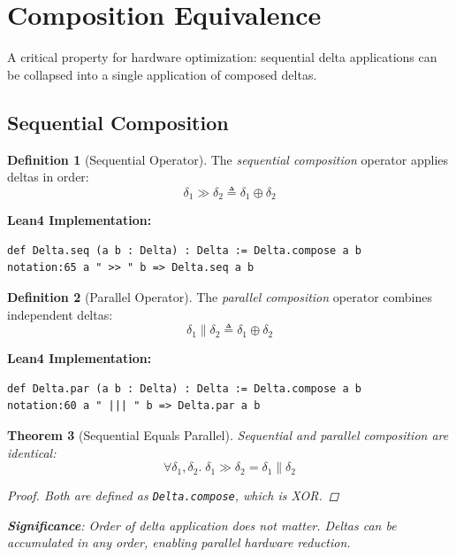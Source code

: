 \documentclass[11pt,letterpaper]{article}
\theoremstyle{plain}
\newtheorem{theorem}{Theorem}[section]
\theoremstyle{definition}
\newtheorem{definition}[theorem]{Definition}
\theoremstyle{remark}
\newcommand{\dcompose}{\oplus}           %
\begin{document}
\section{Composition Equivalence}
\label{sec:composition}

A critical property for hardware optimization: sequential delta applications can be collapsed into a single application of composed deltas.

\subsection{Sequential Composition}

\begin{definition}[Sequential Operator]
\label{def:seq}
The \emph{sequential composition} operator applies deltas in order:
\[
\delta_1 \gg \delta_2 \triangleq \delta_1 \dcompose \delta_2
\]

\noindent\textbf{Lean4 Implementation:}
\begin{lstlisting}
def Delta.seq (a b : Delta) : Delta := Delta.compose a b
notation:65 a " >> " b => Delta.seq a b
\end{lstlisting}
\end{definition}

\begin{definition}[Parallel Operator]
\label{def:par}
The \emph{parallel composition} operator combines independent deltas:
\[
\delta_1 \| \delta_2 \triangleq \delta_1 \dcompose \delta_2
\]

\noindent\textbf{Lean4 Implementation:}
\begin{lstlisting}
def Delta.par (a b : Delta) : Delta := Delta.compose a b
notation:60 a " ||| " b => Delta.par a b
\end{lstlisting}
\end{definition}

\begin{theorem}[Sequential Equals Parallel]
\label{thm:seq-par}
Sequential and parallel composition are identical:
\[
\forall \delta_1, \delta_2.\; \delta_1 \gg \delta_2 = \delta_1 \| \delta_2
\]

\begin{proof}
Both are defined as \texttt{Delta.compose}, which is XOR.
\end{proof}

\noindent\textbf{Significance}: Order of delta application does not matter. Deltas can be accumulated in any order, enabling parallel hardware reduction.
\end{theorem}
\end{document}
